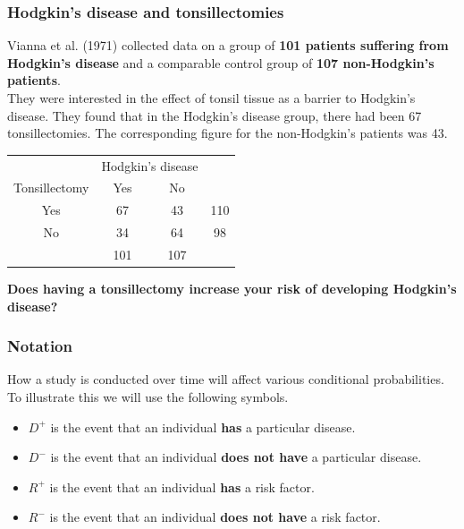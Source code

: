 \documentclass[a4paper]{article}
\begin{document}
\subsubsection{Hodgkin's disease and tonsillectomies}
Vianna et al. (1971) collected data on a group of \textbf{101 patients suffering from Hodgkin's disease} and a comparable control group of \textbf{107 non-Hodgkin's patients}.\\
They were interested in the effect of tonsil tissue as a barrier to Hodgkin's disease. They found that in the Hodgkin's disease group, there had been 67 tonsillectomies. The corresponding figure for the non-Hodgkin's patients was 43.
\begin{table}[H]
	\centering
	\begin{tabular}{@{}ccc|c@{}}
		\toprule
					  & \multicolumn{2}{c}{Hodgkin's disease} &     \\
		Tonsillectomy & Yes                & No                &     \\ \midrule
		Yes           & 67                 & 43                & 110 \\
		No            & 34                 & 64                & 98  \\ \midrule
					  & 101                & 107               &     \\ \bottomrule
		\end{tabular}
\end{table}
\begin{greenbox}
	\textbf{Does having a tonsillectomy increase your risk of developing Hodgkin's disease?}
\end{greenbox}
\subsubsection{Notation}
How a study is conducted over time will affect various conditional probabilities.\\
To illustrate this we will use the following symbols.
\begin{itemize}
	\item \textcolor{mygreen}{\( D^+ \)} is the event that an individual \textbf{has} a particular disease.
	\item \textcolor{mygreen}{\( D^- \)} is the event that an individual \textbf{does not have} a particular disease.
	\item \textcolor{myred}{\( R^+ \)} is the event that an individual \textbf{has} a risk factor.
	\item \textcolor{myred}{\( R^- \)} is the event that an individual \textbf{does not have} a risk factor.
\end{itemize}
\end{document}
